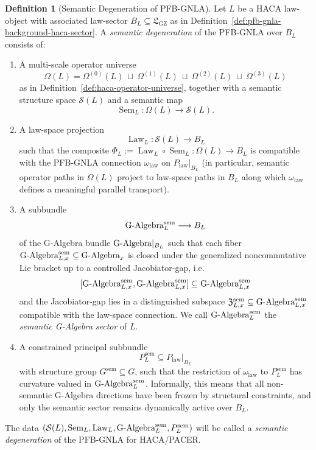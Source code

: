 \documentclass[11pt]{book}
\theoremstyle{plain}
\theoremstyle{definition}
\newtheorem{definition}[theorem]{Definition}
\theoremstyle{remark}
\newcommand{\GZLS}{\ensuremath{\mathfrak{L}_{\mathrm{GZ}}}}       \newcommand{\GZLT}{\ensuremath{M_{!w}}}                           \newcommand{\GZLOC}{\ensuremath{A_M}}                             \newcommand{\GZLC}{\ensuremath{\omega_{\mathrm{law}}}}            \newcommand{\GZLCurv}{\ensuremath{\mathcal{F}_{\mathrm{law}}}}
\begin{document}
\begin{definition}[Semantic Degeneration of PFB-GNLA]
\label{def:semantic-degeneration-pfb-gnla}
Let $L$ be a HACA law-object with associated law-sector $B_L\subseteq
\GZLS$ as in Definition~\ref{def:pfb-gnla-background-haca-sector}.
A \emph{semantic degeneration} of the PFB-GNLA over $B_L$ consists of:
\begin{enumerate}
  \item A multi-scale operator universe
        \[
          \Omega(L)
          =
          \Omega^{(0)}(L)\ \sqcup\ \Omega^{(1)}(L)\ \sqcup\ \Omega^{(2)}(L)\ \sqcup\ \Omega^{(3)}(L)
        \]
        as in Definition~\ref{def:haca-operator-universe}, together with
        a semantic structure space $\mathcal{S}(L)$ and a semantic map
        \[
          \operatorname{Sem}_L:\Omega(L)\longrightarrow \mathcal{S}(L).
        \]
  \item A law-space projection
        \[
          \operatorname{Law}_L:\mathcal{S}(L)\longrightarrow B_L
        \]
        such that the composite
        \(
          \Phi_L:=\operatorname{Law}_L\circ\operatorname{Sem}_L
          :\Omega(L)\to B_L
        \)
        is compatible with the PFB-GNLA connection $\GZLC$ on
        $P_{\mathrm{law}}|_{B_L}$ (in particular, semantic operator paths
        in $\Omega(L)$ project to law-space paths in $B_L$ along which
        $\GZLC$ defines a meaningful parallel transport).
  \item A subbundle
        \[
          \text{G-Algebra}^{\mathrm{sem}}_L
          \longrightarrow B_L
        \]
        of the G-Algebra bundle $\text{G-Algebra}|_{B_L}$ such that each fiber
        $\text{G-Algebra}^{\mathrm{sem}}_{L,x}\subseteq \text{G-Algebra}_x$ is closed
        under the generalized noncommutative Lie bracket up to a
        controlled Jacobiator-gap, i.e.
        \[
          [\text{G-Algebra}^{\mathrm{sem}}_{L,x},
           \text{G-Algebra}^{\mathrm{sem}}_{L,x}]
          \subseteq \text{G-Algebra}^{\mathrm{sem}}_{L,x}
        \]
        and the Jacobiator-gap lies in a distinguished subspace
        $\mathfrak{Z}^{\mathrm{sem}}_{L,x}\subseteq
         \text{G-Algebra}^{\mathrm{sem}}_{L,x}$ compatible with the law-space
        connection.
        We call $\text{G-Algebra}^{\mathrm{sem}}_L$ the \emph{semantic
        G-Algebra sector} of $L$.
  \item A constrained principal subbundle
        \[
          P^{\mathrm{sem}}_L \subseteq P_{\mathrm{law}}|_{B_L}
        \]
        with structure group $G^{\mathrm{sem}}\subseteq G$, such that the
        restriction of $\GZLC$ to $P^{\mathrm{sem}}_L$ has curvature
        valued in $\text{G-Algebra}^{\mathrm{sem}}_L$. Informally, this means
        that all non-semantic G-Algebra directions have been frozen by
        structural constraints, and only the semantic sector remains
        dynamically active over $B_L$.
\end{enumerate}
The data $(\mathcal{S}(L),\operatorname{Sem}_L,\operatorname{Law}_L,
 \text{G-Algebra}^{\mathrm{sem}}_L,P^{\mathrm{sem}}_L)$ will be called a
\emph{semantic degeneration} of the PFB-GNLA for HACA/PACER.
\end{definition}
\end{document}
